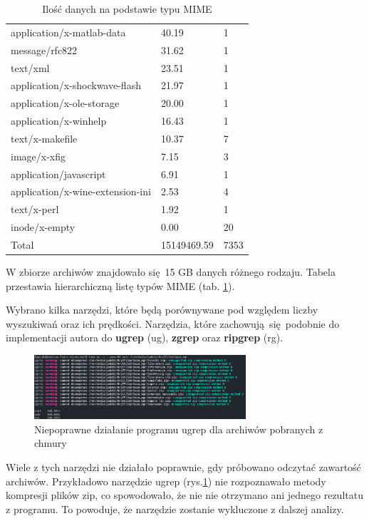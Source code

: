 \begin{table}[h]
\begin{tabular}{|l|l|l|}
application/x-matlab-data & 40.19 & 1 \\
message/rfc822 & 31.62 & 1 \\
text/xml & 23.51 & 1 \\
application/x-shockwave-flash & 21.97 & 1 \\
application/x-ole-storage & 20.00 & 1 \\
application/x-winhelp & 16.43 & 1 \\
text/x-makefile & 10.37 & 7 \\
image/x-xfig & 7.15 & 3 \\
application/javascript & 6.91 & 1 \\
application/x-wine-extension-ini & 2.53 & 4 \\
text/x-perl & 1.92 & 1 \\
inode/x-empty & 0.00 & 20 \\
        \hline
Total & 15149469.59 & 7353 \\
        \hline
    \end{tabular}
    \caption{Ilość danych na podstawie typu MIME}
    \label{tabela:typy-MIME-z-iloscia}
\end{table}

W zbiorze archiwów znajdowało się 15 GB danych różnego rodzaju. Tabela 
przestawia hierarchiczną listę typów MIME (tab. \ref{tabela:typy-MIME-z-iloscia}).

Wybrano kilka narzędzi, które będą porównywane pod względem liczby wyszukiwań
oraz ich prędkości. Narzędzia, które zachowują się podobnie do implementacji
autora do \textbf{ugrep} (ug), \textbf{zgrep} oraz \textbf{ripgrep} (rg). 

\begin{figure}[h]
\centering
\includegraphics[width=0.7\textwidth]{./images/ugrep-errors.png}
\caption{Niepoprawne działanie programu ugrep dla archiwów pobranych z chmury}
\label{fig:ugrepErrors}
\end{figure}

Wiele z tych narzędzi nie działało poprawnie, gdy próbowano odczytać zawartość
archiwów. Przykładowo narzędzie ugrep (rys.\ref{fig:ugrepErrors}) nie rozpoznawało 
metody kompresji plików zip, co spowodowało, że nie nie otrzymano ani 
jednego rezultatu z programu. To powoduje, że narzędzie zostanie wykluczone z 
dalszej analizy.

